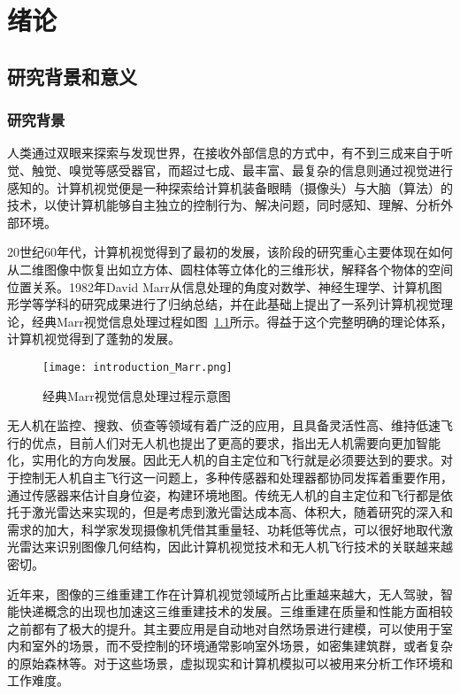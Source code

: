 \chapter{绪论}
\label{cha:chap1}
\section{研究背景和意义}
\label{sec:1.1}
\subsection{研究背景}
\label{sec:1.1.1}
人类通过双眼来探索与发现世界，在接收外部信息的方式中，有不到三成来自于听觉、触觉、嗅觉等感受器官，而超过七成、最丰富、最复杂的信息则通过视觉进行感知的。计算机视觉便是一种探索给计算机装备眼睛（摄像头）与大脑（算法）的技术，以使计算机能够自主独立的控制行为、解决问题，同时感知、理解、分析外部环境。

20世纪60年代，计算机视觉得到了最初的发展，该阶段的研究重心主要体现在如何从二维图像中恢复出如立方体、圆柱体等立体化的三维形状，解释各个物体的空间位置关系。1982年David Marr从信息处理的角度对数学、神经生理学、计算机图形学等学科的研究成果进行了归纳总结，并在此基础上提出了一系列计算机视觉理论，经典Marr视觉信息处理过程如图~\ref{fig:introduction_Marr}所示。得益于这个完整明确的理论体系，计算机视觉得到了蓬勃的发展。
\begin{figure}[H] %
  \centering
  \texttt{[image: introduction\_Marr.png]}
  \caption{经典Marr视觉信息处理过程示意图}
  \label{fig:introduction_Marr}
\end{figure}
无人机在监控、搜救、侦查等领域有着广泛的应用，且具备灵活性高、维持低速飞行的优点，目前人们对无人机也提出了更高的要求，指出无人机需要向更加智能化，实用化的方向发展。因此无人机的自主定位和飞行就是必须要达到的要求。对于控制无人机自主飞行这一问题上，多种传感器和处理器都协同发挥着重要作用，通过传感器来估计自身位姿，构建环境地图。传统无人机的自主定位和飞行都是依托于激光雷达来实现的，但是考虑到激光雷达成本高、体积大，随着研究的深入和需求的加大，科学家发现摄像机凭借其重量轻、功耗低等优点，可以很好地取代激光雷达来识别图像几何结构，因此计算机视觉技术和无人机飞行技术的关联越来越密切。

近年来，图像的三维重建工作在计算机视觉领域所占比重越来越大，无人驾驶，智能快递概念的出现也加速这三维重建技术的发展。三维重建在质量和性能方面相较之前都有了极大的提升。其主要应用是自动地对自然场景进行建模，可以使用于室内和室外的场景，而不受控制的环境通常影响室外场景，如密集建筑群，或者复杂的原始森林等。对于这些场景，虚拟现实和计算机模拟可以被用来分析工作环境和工作难度。

